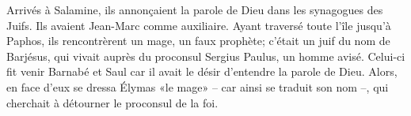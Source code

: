 Arrivés à Salamine,
	ils annonçaient la parole de Dieu dans les synagogues des Juifs.
Ils avaient Jean-Marc comme auxiliaire.
Ayant traversé toute l’île jusqu’à Paphos,
	ils rencontrèrent un mage, un faux prophète;
	c’était un juif du nom de Barjésus,
	qui vivait auprès du proconsul Sergius Paulus, un homme avisé.
Celui-ci fit venir Barnabé et Saul
	car il avait le désir d’entendre la parole de Dieu.
Alors, en face d’eux se dressa Élymas «le mage»
	– car ainsi se traduit son nom –,
	qui cherchait à détourner le proconsul de la foi.
